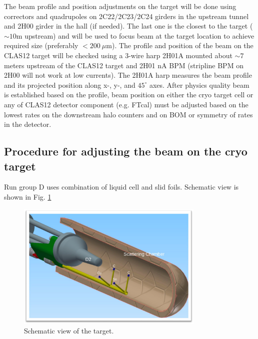 The beam profile and position adjustments on the target will be done using correctors and quadrupoles on 2C22/2C23/2C24 girders in the upstream tunnel and 2H00 girder in the hall (if needed). The last one is the closest to the target ($\sim 10$m upstream) and will be used to focus beam at the target location to achieve required size (preferably $<200~\mu$m). The profile and position of the beam on the CLAS12 target will be checked using a 3-wire harp 2H01A mounted about $\sim 7$ meters upstream of the CLAS12 target and 2H01 nA BPM (stripline BPM on 2H00 will not work at low currents). The 2H01A harp measures the beam profile and its projected position along x-, y-, and $45^\circ$ axes. After physics quality beam is established based on the profile, beam position on either the cryo target cell or any of CLAS12 detector component (e.g. FTcal) must be adjusted based on the lowest rates on the downstream halo counters and on BOM or symmetry of rates in the detector. 

\subsection{Procedure for adjusting the beam on the cryo target}
Run group D uses combination of liquid cell and slid foils. Schematic view is shown in Fig. \ref{fig:RGDT}

\begin{figure}[htb!]
\centering
\includegraphics[width=0.8\textwidth]{RGDtarget.png}
\caption{Schematic view of the target.}
\label{fig:RGDT}
\end{figure}

